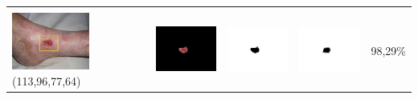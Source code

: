\begin{table}[H]
\begin{tabular}{|m{1.0in}|m{1.0in}|m{1.0in}|m{1.0in}|m{0.6in}|}
		
		&  &  & \\
		\includegraphics[width=1.0in]{gambar/hasil_segmentasi/luka_merah/image_30_rect.jpg} {\centering\fontsize{10}{10}\selectfont(113,96,77,64)}&
		\includegraphics[width=1.0in]{gambar/hasil_segmentasi/luka_merah/result_30.jpg}&
		\includegraphics[width=1.0in]{gambar/hasil_segmentasi/luka_merah/mask_r_30.jpg}&
		\includegraphics[width=1.0in]{gambar/hasil_segmentasi/luka_merah/30_r.jpg}&
		98,29\% \\
		\hline
	\end{tabular}
\end{table}

